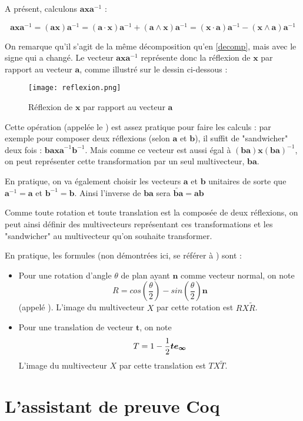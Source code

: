 A présent, calculons $\bm{axa}^{-1}$ : 

$$ \bm{axa}^{-1} = (\bm{ax})\bm{a}^{-1} = (\bm{a}\cdot \bm{x})\bm{a}^{-1}+(\bm{a}\wedge \bm{x})\bm{a}^{-1} = (\bm{x}\cdot \bm{a})\bm{a}^{-1}-(\bm{x}\wedge \bm{a})\bm{a}^{-1} $$

On remarque qu'il s'agit de la même décomposition qu'en \ref{decomp}, mais avec le signe qui a changé. Le vecteur $\bm{axa}^{-1}$ représente donc la réflexion de $\bm{x}$ par rapport au vecteur $\bm{a}$, comme illustré sur le dessin ci-dessous : 

\begin{figure}[!ht]
\centering
\texttt{[image: reflexion.png]}
\caption{Réflexion de $\bm{x}$ par rapport au vecteur $\bm{a}$}
\label{reflexion}
\end{figure}

Cette opération (appelée le ) est assez pratique pour faire les calculs : par exemple pour composer deux réflexions (selon $\bm{a}$ et $\bm{b}$), il suffit de "sandwicher" deux fois : $\bm{baxa}^{-1}\bm{b}^{-1}$. Mais comme ce vecteur est aussi égal à $(\bm{ba})\bm{x}(\bm{ba})^{-1}$, on peut représenter cette transformation par un seul multivecteur, $\bm{ba}$.

En pratique, on va également choisir les vecteurs $\bm{a}$ et $\bm{b}$ unitaires de sorte que $\bm{a}^{-1}=\bm{a}$ et $\bm{b}^{-1}=\bm{b}$. Ainsi l'inverse de $\bm{ba}$ sera $\tilde{\bm{ba}} = \bm{ab}$

Comme toute rotation et toute translation est la composée de deux réflexions, on peut ainsi définir des multivecteurs représentant ces transformations et les "sandwicher" au multivecteur qu'on souhaite transformer. 

En pratique, les formules (non démontrées ici, se référer à \cite{Dorst}) sont : 
\begin{itemize}
\item Pour une rotation d'angle $\theta$ de plan ayant $\bm{n}$ comme vecteur normal, on note $$R = cos\left(\frac{\theta}{2}\right)- sin\left(\frac{\theta}{2}\right) \bm{n}$$ (appelé ). L'image du multivecteur $X$ par cette rotation est $RX\tilde{R}$.
\item Pour une translation de vecteur $\bm{t}$, on note $$T = 1-\frac{1}{2} \bm{t} \bm{e_{\infty}} $$ L'image du multivecteur $X$ par cette translation est $TX\tilde{T}$.
\end{itemize}

\section{L'assistant de preuve Coq}

